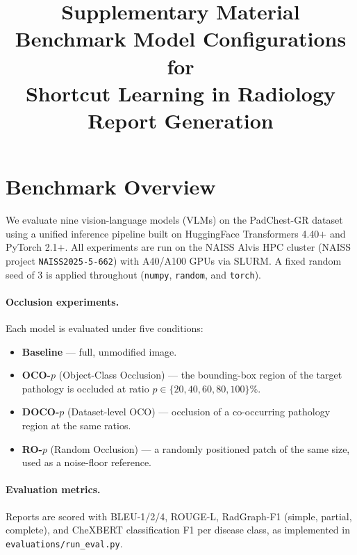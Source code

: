 \documentclass[10pt,a4paper]{article}
\title{\textbf{Supplementary Material}\\[4pt]
       \large Benchmark Model Configurations for\\
       Shortcut Learning in Radiology Report Generation}
\date{}
\begin{document}
\maketitle
\tableofcontents
\clearpage

\section{Benchmark Overview}
\label{sec:overview}

We evaluate nine vision-language models (VLMs) on the PadChest-GR dataset
using a unified inference pipeline built on HuggingFace Transformers
4.40$+$ and PyTorch 2.1$+$.
All experiments are run on the NAISS Alvis HPC cluster (NAISS project
\texttt{NAISS2025-5-662}) with A40/A100 GPUs via SLURM.
A fixed random seed of 3 is applied throughout (\texttt{numpy},
\texttt{random}, and \texttt{torch}).

\paragraph{Occlusion experiments.}
Each model is evaluated under five conditions:
\begin{itemize}
  \item \textbf{Baseline} — full, unmodified image.
  \item \textbf{OCO-$p$} (Object-Class Occlusion) — the bounding-box region
        of the target pathology is occluded at ratio $p \in \{20, 40, 60,
        80, 100\}\%$.
  \item \textbf{DOCO-$p$} (Dataset-level OCO) — occlusion of a co-occurring
        pathology region at the same ratios.
  \item \textbf{RO-$p$} (Random Occlusion) — a randomly positioned patch of
        the same size, used as a noise-floor reference.
\end{itemize}

\paragraph{Evaluation metrics.}
Reports are scored with BLEU-1/2/4, ROUGE-L, RadGraph-F1 (simple, partial,
complete), and CheXBERT classification F1 per disease class, as implemented
in \texttt{evaluations/run\_eval.py}.

\end{document}
